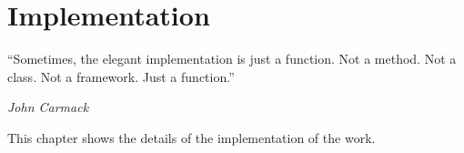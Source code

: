 \chapter{Implementation}
\label{c:implementation}

\epigraph{\enquote{Sometimes, the elegant implementation is just a function. Not a method. Not a class. Not a framework. Just a function.}}{\emph{John Carmack}}

This chapter shows the details of the implementation of the work.
